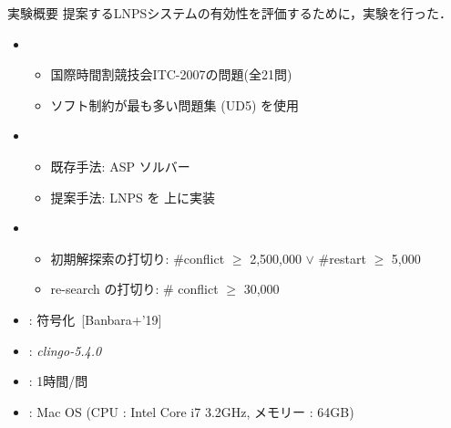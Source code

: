 \documentclass[11pt,dvipdfmx]{beamer}
\begin{document}
\begin{frame}{実験概要}
  提案するLNPSシステムの有効性を評価するために，実験を行った．
  \bigskip
  \begin{itemize}
  \item {}
    \begin{itemize}
    \item 国際時間割競技会ITC-2007の問題(全21問)
    \item ソフト制約が最も多い問題集 (UD5) を使用
    \end{itemize}
  \item {}
    \begin{itemize}
    \item 既存手法: ASP ソルバー{\clingo}
    \item 提案手法: LNPS を{\clingo} 上に実装
    \end{itemize}
   \item {}
    \begin{itemize}
    \item 初期解探索の打切り:
      \#conflict $\geq$ 2,500,000 $\lor$ \#restart $\geq$ 5,000
     \item re-search の打切り: \# conflict $\geq$ 30,000
    \end{itemize}
  \item {}: {\teaspoon} 符号化~[Banbara+'19]
  \item {}: \textit{clingo-5.4.0}
  \item {}: 1時間/問
  \item {}: Mac OS (CPU : Intel Core i7 3.2GHz, メモリー : 64GB) 
  \end{itemize}
\end{frame}
\end{document}

